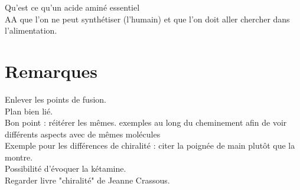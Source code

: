 \documentclass[12pt,prb,aps,epsf]{article}
\begin{document}
Qu'est ce qu'un acide aminé essentiel\\
AA que l'on ne peut synthétiser (l'humain) et que l'on doit aller chercher dans l'alimentation.

\section*{Remarques}
Enlever les points de fusion.\\
Plan bien lié.\\
Bon point : réitérer les mêmes. exemples au long du cheminement afin de voir différents aspects avec de mêmes molécules\\
Exemple pour les différences de chiralité : citer la poignée de main plutôt que la montre.\\
Possibilité d'évoquer la kétamine.\\
Regarder livre "chiralité" de Jeanne Crassous.
\end{document}
